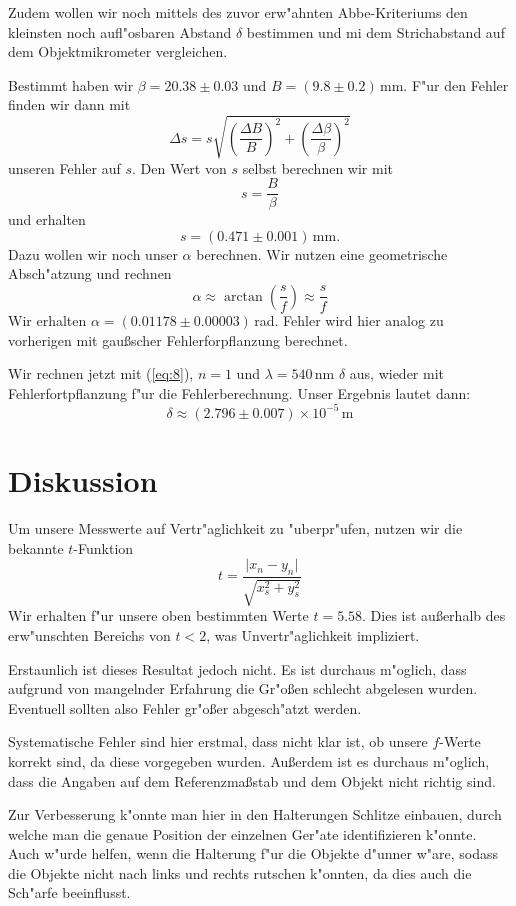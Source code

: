 \documentclass[11pt,a4paper]{article}
\begin{document}
Zudem wollen wir noch mittels des zuvor erw"ahnten Abbe-Kriteriums den kleinsten noch aufl"osbaren Abstand $\delta$ bestimmen und mi dem Strichabstand auf dem Objektmikrometer vergleichen.

Bestimmt haben wir $\beta=20.38\pm0.03$ und $B=(9.8\pm0.2)\,$mm. F"ur den Fehler finden wir dann mit
\[\Delta s=s\sqrt{\left(\frac{\Delta B}{B}\right)^2+\left(\frac{\Delta\beta}{\beta}\right)^2}\]
unseren Fehler auf $s$. Den Wert von $s$ selbst berechnen wir mit
\[s=\frac{B}{\beta}\]
und erhalten
\[s=(0.471\pm0.001)\,\mathrm{mm}.\]
Dazu wollen wir noch unser $\alpha$ berechnen. Wir nutzen eine geometrische Absch"atzung und rechnen
\[\alpha\approx\arctan\left(\frac{s}{f}\right)\approx\frac{s}{f}\]
Wir erhalten $\alpha=(0.01178\pm0.00003)$\,rad. Fehler wird hier analog zu vorherigen mit gau\ss scher Fehlerforpflanzung berechnet.

Wir rechnen jetzt mit (\ref{eq:8}), $n=1$ und $\lambda=540\,$nm $\delta$ aus, wieder mit Fehlerfortpflanzung f"ur die Fehlerberechnung. Unser Ergebnis lautet dann:
\[\delta\approx(2.796\pm0.007)\times10^{-5}\,\mathrm{m}\]

\section{Diskussion}

Um unsere Messwerte auf Vertr"aglichkeit zu "uberpr"ufen, nutzen wir die bekannte $t$-Funktion
\begin{equation}
t=\frac{\vert x_n-y_n\vert}{\sqrt{x_s^2+y_s^2}}\label{eq:6}
\end{equation}
Wir erhalten f"ur unsere oben bestimmten Werte $t=5.58$. Dies ist au\ss erhalb des erw"unschten Bereichs von $t<2$, was Unvertr"aglichkeit impliziert.

Erstaunlich ist dieses Resultat jedoch nicht. Es ist durchaus m"oglich, dass aufgrund von mangelnder Erfahrung die Gr"o\ss en schlecht abgelesen wurden. Eventuell sollten also Fehler gr"o\ss er abgesch"atzt werden.

Systematische Fehler sind hier erstmal, dass nicht klar ist, ob unsere $f$-Werte korrekt sind, da diese vorgegeben wurden. Au\ss erdem ist es durchaus m"oglich, dass die Angaben auf dem Referenzma\ss stab und dem Objekt nicht richtig sind. 

Zur Verbesserung k"onnte man hier in den Halterungen Schlitze einbauen, durch welche man die genaue Position der einzelnen Ger"ate identifizieren k"onnte. Auch w"urde helfen, wenn die Halterung f"ur die Objekte d"unner w"are, sodass die Objekte nicht nach links und rechts rutschen k"onnten, da dies auch die Sch"arfe beeinflusst.
\end{document}
